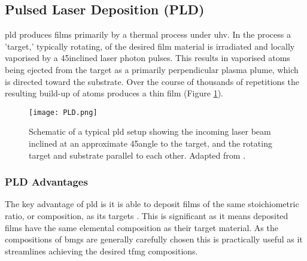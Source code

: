\documentclass[a4paper,12pt,oneside]{report}%
\begin{document}
\subsection{Pulsed Laser Deposition (PLD)}
\Acrfull{pld} produces films primarily by a thermal process under \gls{uhv}. In the process a 'target,' typically rotating, of the desired film material is irradiated and locally vaporised by a 45\degree inclined laser photon pulses. This results in vaporised atoms being ejected from the target as a primarily perpendicular plasma plume, which is directed toward the substrate. Over the course of thousands of repetitions the resulting build-up of atoms produces a thin film (Figure \ref{fig:PLD}). 

\begin{figure}[htbp]
	\centering
	\texttt{[image: PLD.png]}
	\caption[Schematic of a typical \acrshort{pld} setup showing the incoming laser beam inclined at an approximate 45\degree angle to the target, and the rotating target and substrate parallel to each other.]{Schematic of a typical \acrshort{pld} setup showing the incoming laser beam inclined at an approximate 45\degree angle to the target, and the rotating target and substrate parallel to each other. Adapted from \cite{Krebs1993}.}
	\label{fig:PLD}
\end{figure}

\subsubsection{PLD Advantages}
The key advantage of \gls{pld} is it is able to deposit films of the same stoichiometric ratio, or composition, as its targets \cite{Dijkkamp1987, Heitz1990}. This is significant as it means deposited films have the same elemental composition as their target material. As the compositions of \glspl{bmg} are generally carefully chosen this is practically useful as it streamlines achieving the desired \gls{tfmg} compositions. 
\end{document}
